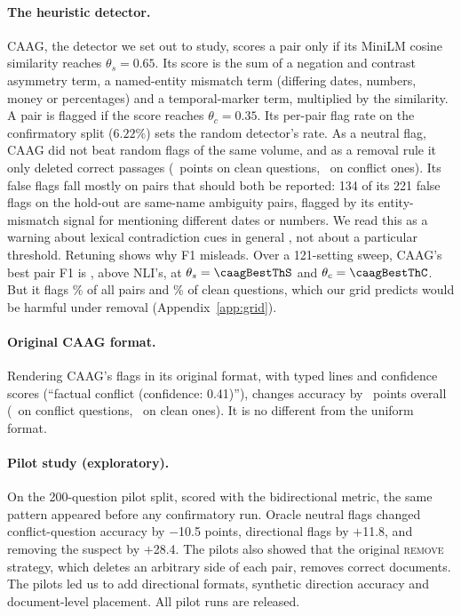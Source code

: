 \paragraph{The heuristic detector.}
CAAG, the detector we set out to study, scores a pair only if its MiniLM \citep{reimers2019sbert} cosine similarity reaches $\theta_s=0.65$. Its score
is the sum of a negation and contrast asymmetry term, a named-entity mismatch term (differing dates, numbers, money or
percentages) and a temporal-marker term, multiplied by the similarity. A pair is flagged if the score reaches
$\theta_c=0.35$. Its per-pair flag rate on the confirmatory split ($6.22\%$) sets the random detector's rate.
As a neutral flag, CAAG did not beat random flags of the same volume, and
as a removal rule it only deleted correct passages (\dCaagRemClean\ points on clean questions, \dCaagRemConf\ on
conflict ones). Its false flags fall mostly on pairs that should both be reported: 134 of its 221 false flags on the
hold-out are same-name ambiguity pairs, flagged by its entity-mismatch signal for mentioning different dates or
numbers. We read this as a warning about lexical contradiction cues in general \citep{gururangan2018annotation},
not about a particular threshold. Retuning shows why F1 misleads. Over a 121-setting sweep, CAAG's
best pair F1 is \caagBestFOne, above NLI's, at $\theta_s=\caagBestThS$ and $\theta_c=\caagBestThC$. But it flags \caagBestRate\% of all pairs and \caagBestCleanFpr\% of clean questions, which our grid predicts
would be harmful under removal (Appendix~\ref{app:grid}).

\paragraph{Original CAAG format.}
Rendering CAAG's flags in its original format, with typed lines and confidence scores (``factual conflict (confidence:
0.41)''), changes accuracy by \origCaagAll\ points overall (\origCaagConf\ on conflict questions, \origCaagClean\ on
clean ones). It is no different from the uniform format.

\paragraph{Pilot study (exploratory).}
On the 200-question pilot split, scored with the bidirectional metric, the same pattern appeared before any
confirmatory run. Oracle neutral flags changed conflict-question accuracy by $-$10.5 points, directional flags by
$+$11.8, and removing the suspect by $+$28.4. The pilots also showed that the original \textsc{remove} strategy,
which deletes an arbitrary side of each pair, removes correct documents. The pilots led us to add directional formats,
synthetic direction accuracy and document-level placement. All pilot runs are released.

